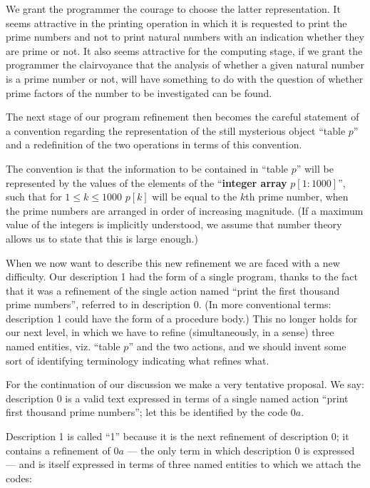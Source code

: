 We grant the programmer the courage to choose the latter representation. It seems attractive in the printing operation in which it is requested to print the prime numbers and not to print natural numbers with an indication whether they are prime or not. It also seems attractive for the computing stage, if we grant the programmer the clairvoyance that the analysis of whether a given natural number is a prime number or not, will have something to do with the question of whether prime factors of the number to be investigated can be found.

The next stage of our program refinement then becomes the careful statement of a convention regarding the representation of the still mysterious object ``table $p$'' and a redefinition of the two operations in terms of this convention.

The convention is that the information to be contained in ``table $p$'' will be represented by the values of the elements of the ``\textbf{integer array} $p[1 : 1000]$'', such that for $1 \leqslant k \leqslant 1000$ $p[k]$ will be equal to the $k$th prime number, when the prime numbers are arranged in order of increasing magnitude. (If a maximum value of the integers is implicitly understood, we assume that number theory allows us to state that this is large enough.)

When we now want to describe this new refinement we are faced with a new difficulty. Our description 1 had the form of a single program, thanks to the fact that it was a refinement of the single action named ``print the first thousand prime numbers'', referred to in description 0. (In more conventional terms: description 1 could have the form of a procedure body.) This no longer holds for our next level, in which we have to refine (simultaneously, in a sense) three named entities, viz. ``table $p$'' and the two actions, and we should invent some sort of identifying terminology indicating what refines what.

For the continuation of our discussion we make a very tentative proposal. We say: description 0 is a valid text expressed in terms of a single named action ``print first thousand prime numbers''; let this be identified by the code $0a$.

Description 1 is called ``1'' because it is the next refinement of description 0; it contains a refinement of $0a$ --- the only term in which description 0 is expressed --- and is itself expressed in terms of three named entities to which we attach the codes:

